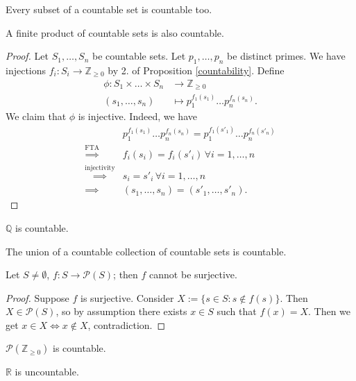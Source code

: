 \documentclass{scrartcl}
\def\ge{\geqslant}
\def\Z{\mathbb{Z}}
\def\R{\mathbb{R}}
\def\Q{\mathbb{Q}}
\begin{document}
\begin{corollary}
	Every subset of a countable set is countable too. 
\end{corollary}
\begin{proposition}
	A finite product of countable sets is also countable.
\end{proposition}
\begin{proof}
	Let $S_1, \dots, S_n$ be countable sets. Let $p_1, \dots, p_n$ be distinct primes. We have injections $f_i: S_i \to \Z_{\ge 0}$ by 2. of Proposition \ref{countability}. Define 
	\begin{align*}
		\phi:  S_1 \times \dots \times S_n &\to \Z_{\ge 0} \\
		 (s_1, \dots, s_n) &\mapsto p_1^{f_1(s_1)}\dots p_n^{f_n(s_n)}.
	\end{align*}
	We claim that $\phi$ is injective. Indeed, we have
	\begin{align*}
		&p_1^{f_1(s_1)}\dots p_n^{f_n(s_n)} = p_1^{f_1(s'_1)}\dots p_n^{f_n(s'_n)} \\
		\overset{\text{FTA}}{\implies} & f_i(s_i) = f_i(s'_i) \,\forall i=1, \dots, n \\
		\overset{\text{injectivity}}{\implies} & s_i = s'_i \,\forall i=1, \dots, n \\
		\implies & (s_1, \dots, s_n) = (s'_1, \dots, s'_n). 
	\end{align*}
\end{proof}
\begin{corollary}
	$\Q$ is countable.
\end{corollary}
\begin{proposition}
	The union of a countable collection of countable sets is countable.
\end{proposition}
\begin{lemma}
	Let $S \ne \emptyset$, $f: S \to \mathcal{P}(S)$; then $f$ cannot be surjective.
\end{lemma}
\begin{proof}
	Suppose $f$ is surjective. Consider $X:= \{s \in S : s \notin f(s)\}$. Then $X \in \mathcal{P}(S)$, so by assumption there exists $x \in S$ such that $f(x) = X$. Then we get $x \in X \iff x \notin X$, contradiction. 
\end{proof}
\begin{corollary}
	$\mathcal{P}(\Z_{\ge 0})$ is countable.
\end{corollary}
\begin{corollary}
	$\R$ is uncountable.
\end{corollary}
\end{document}
